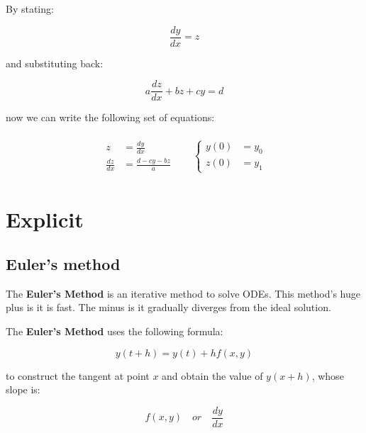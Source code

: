 \documentclass[10pt,b5paper,titlepage]{book}
\newenvironment{eqarray}
{
    \begin{eqnarray}
        \begin{aligned}
}
{
        \end{aligned}
    \end{eqnarray}
}
\begin{document}
By stating:

\begin{equation}
    \frac{dy}{dx} = z
\end{equation}

and substituting back:

\begin{equation}
    a \frac{dz}{dx} + b z + c y = d
\end{equation}

now we can write the following set of equations:

\begin{eqarray}
    \begin{aligned}
        z &= \frac{dy}{dx}\\
        \frac{dz}{dx} &= \frac{d - c y - b z}{a}
    \end{aligned} &
    \quad \left\{
    \begin{aligned}
        y(0) &= y_0\\
        z(0) &= y_1
    \end{aligned} \right.
\end{eqarray}



\section{Explicit}

\subsection{Euler's method}
The \textbf{Euler's Method} is an iterative method to solve ODEs. This method's
huge plus is it is fast. The minus is it gradually diverges from the ideal solution.

The \textbf{Euler's Method} uses the following formula:

\begin{equation}
    y(t + h) = y(t) + h f(x,y)
\end{equation}

to construct the tangent at point $ x $ and obtain the value of $ y(x + h) $,
whose slope is:

\begin{equation}
    f(x,y) \quad or \quad \frac{dy}{dx}
\end{equation}
\end{document}
